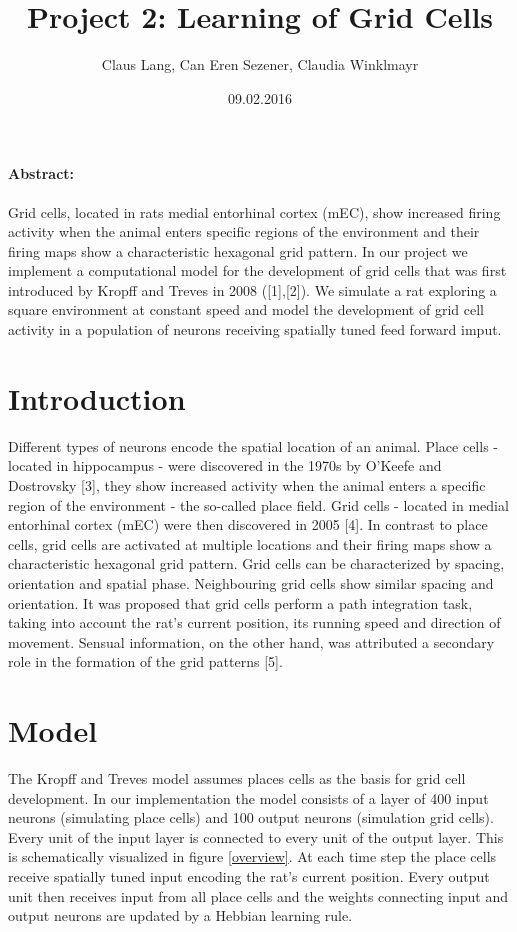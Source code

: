 \documentclass[a4paper, 12pt]{article}
\title{Project 2: Learning of Grid Cells}
\author{Claus Lang, Can Eren Sezener, Claudia Winklmayr}
\date{09.02.2016}
\begin{document}
\maketitle

\paragraph{Abstract:}
Grid cells, located in rats medial entorhinal cortex (mEC), show increased firing activity when the animal enters specific regions of the environment and their firing maps show a characteristic hexagonal grid pattern. In our project we implement a computational model for the development of grid cells that was first introduced by Kropff and Treves in 2008 ([1],[2]). We simulate a rat exploring a square environment at constant speed and model the development of grid cell activity in a population of neurons receiving spatially tuned feed forward imput. 
 

\section{Introduction}
Different types of neurons encode the spatial location of an animal. Place cells - located in hippocampus - were discovered in the 1970s by O'Keefe and Dostrovsky [3], they show increased activity when the animal enters a specific region of the environment - the so-called place field.\newline
Grid cells - located in medial entorhinal cortex (mEC) were then discovered in 2005 [4]. In contrast to place cells, grid cells are activated at multiple locations and their firing maps show a characteristic hexagonal grid pattern. Grid cells can be characterized by spacing, orientation and spatial phase. Neighbouring grid cells show similar spacing and orientation. \newline
It was proposed that grid cells perform a path integration task, taking into account the rat's current position, its running speed and direction of movement. Sensual information, on the other hand, was attributed a secondary role in the formation of the grid patterns [5]. \newline
%
%
%
\section{Model}
The Kropff and Treves model assumes places cells as the basis for grid cell development. In our implementation the model consists of a layer of 400 input neurons (simulating place cells) and 100 output neurons (simulation grid cells). Every unit of the input layer is connected to every unit of the output layer. This is schematically visualized in figure \ref{overview}. At each time step the place cells receive spatially tuned input encoding the rat's current position. Every output unit then receives input from all place cells and the weights connecting input and output neurons are updated by a Hebbian learning rule. 
\end{document}
